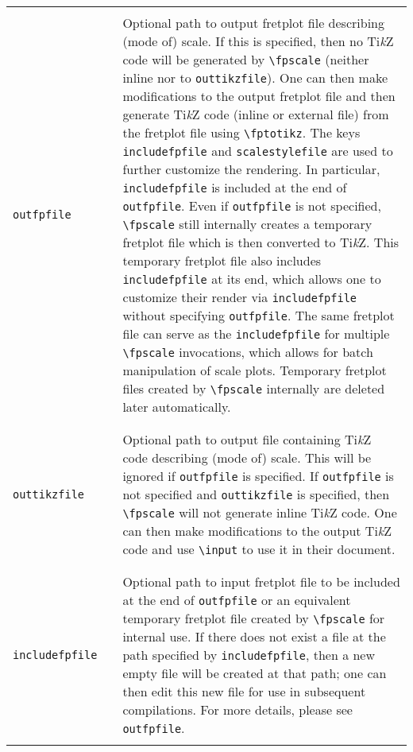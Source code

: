 \documentclass[12pt,letterpaper]{article}
\begin{document}
\begin{table}[H]
\begin{tabular}{|l|l|p{8cm}|}
&&\\
\texttt{outfpfile} &  & Optional path to output fretplot file describing (mode of) scale. If this is specified, then no Ti\textit{k}Z code will be generated by \texttt{\textbackslash fpscale} (neither inline nor to \texttt{outtikzfile}). One can then make modifications to the output fretplot file and then generate Ti\textit{k}Z code (inline or external file) from the fretplot file using \texttt{\textbackslash fptotikz}. The keys \texttt{includefpfile} and \texttt{scalestylefile} are used to further customize the rendering. In particular, \texttt{includefpfile} is included at the end of \texttt{outfpfile}. Even if \texttt{outfpfile} is not specified, \texttt{\textbackslash fpscale} still internally creates a temporary fretplot file which is then converted to Ti\textit{k}Z. This temporary fretplot file also includes \texttt{includefpfile} at its end, which allows one to customize their render via \texttt{includefpfile} without specifying \texttt{outfpfile}. The same fretplot file can serve as the \texttt{includefpfile} for multiple \texttt{\textbackslash fpscale} invocations, which allows for batch manipulation of scale plots. Temporary fretplot files created by \texttt{\textbackslash fpscale} internally are deleted later automatically.\\
&&\\

\hline

&&\\
\texttt{outtikzfile} &  & Optional path to output file containing Ti\textit{k}Z code describing (mode of) scale. This will be ignored if \texttt{outfpfile} is specified. If \texttt{outfpfile} is not specified and \texttt{outtikzfile} is specified, then \texttt{\textbackslash fpscale} will not generate inline Ti\textit{k}Z code. One can then make modifications to the output Ti\textit{k}Z code and use \texttt{\textbackslash input} to use it in their document.\\
&&\\

\hline

&&\\
\texttt{includefpfile} &  & Optional path to input fretplot file to be included at the end of \texttt{outfpfile} or an equivalent temporary fretplot file created by \texttt{\textbackslash fpscale} for internal use. If there does not exist a file at the path specified by \texttt{includefpfile}, then a new empty file will be created at that path; one can then edit this new file for use in subsequent compilations. For more details, please see \texttt{outfpfile}.\\
&&\\


\end{tabular}
\end{table}
\end{document}

